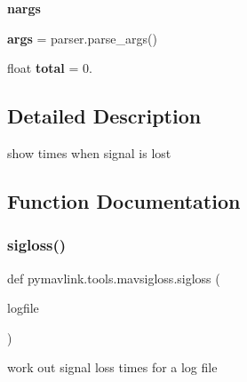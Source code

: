 \begin{DoxyCompactItemize}
{\bfseries nargs}
\item 
\mbox{\label{namespacepymavlink_1_1tools_1_1mavsigloss_a48978a9ae0e95f156dd73c139f94f7c9}} 
{\bfseries args} = parser.\+parse\+\_\+args()
\item 
\mbox{\label{namespacepymavlink_1_1tools_1_1mavsigloss_a6feee5cb03fa0acb15f105598258087b}} 
float {\bfseries total} = 0.
\end{DoxyCompactItemize}


\subsection{Detailed Description}
\begin{DoxyVerb}show times when signal is lost
\end{DoxyVerb}
 

\subsection{Function Documentation}
\mbox{\label{namespacepymavlink_1_1tools_1_1mavsigloss_a15d6bb0d2eb142440ea44a1feb3b7b8c}} 
\subsubsection{\texorpdfstring{sigloss()}{sigloss()}}
{\footnotesize\ttfamily def pymavlink.\+tools.\+mavsigloss.\+sigloss (\begin{DoxyParamCaption}\item[{}]{logfile }\end{DoxyParamCaption})}

\begin{DoxyVerb}work out signal loss times for a log file\end{DoxyVerb}
 